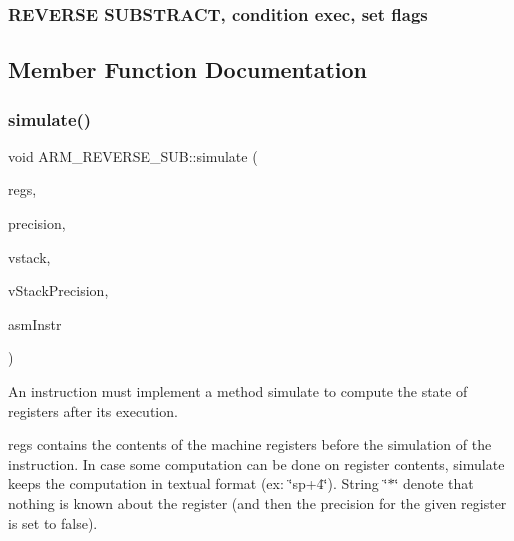  \subsubsection*{R\+E\+V\+E\+R\+SE S\+U\+B\+S\+T\+R\+A\+CT, condition exec, set flags }

\subsection{Member Function Documentation}
\mbox{\label{classARM__REVERSE__SUB_a0606f63f3d08541627b5758675ca052c}} 
\subsubsection{\texorpdfstring{simulate()}{simulate()}}
{\footnotesize\ttfamily void A\+R\+M\+\_\+\+R\+E\+V\+E\+R\+S\+E\+\_\+\+S\+U\+B\+::simulate (\begin{DoxyParamCaption}\item[{\hyperlink{DAAInstruction_8h_af0fae93a861de9cf37988d5673cac523}{reg\+Table} \&}]{regs,  }\item[{\hyperlink{DAAInstruction_8h_a0e8cae02815a5f8adc750122d790b455}{reg\+Precision\+Table} \&}]{precision,  }\item[{\hyperlink{DAAInstruction_8h_a1b0e70ac1a04f06c8132055ed01f589f}{stack\+Type} \&}]{vstack,  }\item[{\hyperlink{DAAInstruction_8h_ac5cb793e9dac3fa9693da78b7e29ab30}{stack\+Prec\+Type} \&}]{v\+Stack\+Precision,  }\item[{const string \&}]{asm\+Instr }\end{DoxyParamCaption})\hspace{0.3cm}{\ttfamily [virtual]}}

An instruction must implement a method simulate to compute the state of registers after its execution.

regs contains the contents of the machine registers before the simulation of the instruction. In case some computation can be done on register contents, simulate keeps the computation in textual format (ex\+: \char`\"{}sp+4\char`\"{}). String \char`\"{}$\ast$\char`\"{} denote that nothing is known about the register (and then the precision for the given register is set to false).

